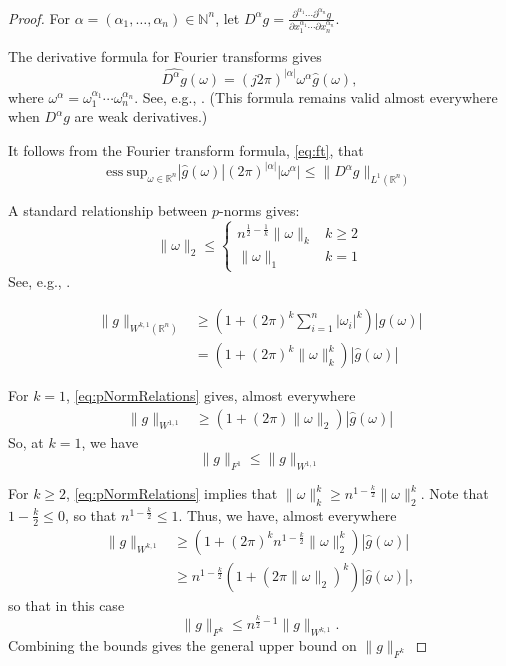 \documentclass[twoside]{article}
\theoremstyle{definition}
\newcommand{\N}{\mathbb{N}}
\newcommand{\R}{\mathbb{R}}
\newcommand{\1}[1]{\scalebox{1.25}{$\mathds{1}$}\left[#1\right]}
\begin{document}
\begin{proof}
For $\alpha = (\alpha_1,\ldots,\alpha_n)\in\N^n$, let $D^{\alpha}g=\frac{\partial^{\alpha_1}\cdots \partial^{\alpha_n}g}{\partial x_1^{\alpha_1} \cdots \partial x_n^{\alpha_n}}$.

The derivative formula for Fourier transforms gives 
$$
\widehat{D^{\alpha} g}(\omega) = (j2\pi)^{|\alpha|} \omega^{\alpha} \hat g(\omega),
$$
where $\omega^{\alpha}=\omega_1^{\alpha_1}\cdots \omega_n^{\alpha_n}.$ See, e.g., \cite{kammler2007first}. (This formula remains valid almost everywhere when $D^{\alpha}g$ are  weak derivatives.)

It follows from the Fourier transform formula, \eqref{eq:ft}, that
$$
\mathrm{ess\:sup}_{\omega\in\R^n}|\hat g(\omega)|(2\pi)^{|\alpha|} |\omega^{\alpha} |\le \|D^{\alpha}g\|_{L^1(\R^n)}
$$

A standard relationship between $p$-norms gives:
\begin{equation}
\label{eq:pNormRelations}
\|\omega\|_2 \le \begin{cases}n^{\frac{1}{2}-\frac{1}{k}}\|\omega\|_k & k\ge 2 \\
\|\omega\|_1 & k=1
\end{cases}
\end{equation}
See, e.g., \cite{horn2012matrix}.

\begin{align*}
\|g\|_{W^{k,1}(\R^n)}&\ge \left(1 + (2\pi)^k\sum_{i=1}^n |\omega_i|^k\right)|\hat g(\omega)| \\
&=\left(1 + (2\pi)^k\|\omega\|_k^k\right)|\hat g(\omega)|
\end{align*}

For $k=1$, \eqref{eq:pNormRelations} gives, almost everywhere
\begin{align*}
\|g\|_{W^{1,1}}
&\ge\left(1 + (2\pi) \|\omega\|_2\right)|\hat g(\omega)|
\end{align*}
So, at $k=1$, we have
$$
\|g\|_{F^1}\le \|g\|_{W^{1,1}}
$$

For $k\ge 2$, \eqref{eq:pNormRelations} implies that $\|\omega\|_k^k\ge n^{1-\frac{k}{2}} \|\omega\|_2^k$. Note that $1-\frac{k}{2}\le 0$, so that $n^{1-\frac{k}{2}}\le 1.$
Thus, we have, almost everywhere
\begin{align*}
\|g\|_{W^{k,1}}
&\ge\left(1 + (2\pi)^k n^{1-\frac{k}{2}} \|\omega\|_2^k\right)|\hat g(\omega)| \\
&\ge  n^{1-\frac{k}{2}} \left(1+(2\pi\|\omega\|_2)^k\right)|\hat g(\omega)|,
\end{align*}
so that in this case
$$
\|g\|_{F^k}\le n^{\frac{k}{2}-1}\|g\|_{W^{k,1}}.
$$
Combining the bounds gives the general upper bound on $\|g\|_{F^k}$
\end{proof}
\end{document}
